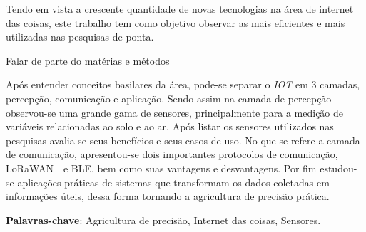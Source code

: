 \documentclass[
article,			%
12pt,				%
oneside,			%
a4paper,			%
english,			%
brazil,				%
sumario=tradicional
]{abntex2}
\begin{document}

\frenchspacing 


%
%

\maketitle



\begin{resumoumacoluna}
    Tendo em vista a crescente quantidade de novas tecnologias na área de internet das coisas, este trabalho tem como objetivo observar as mais eficientes e mais utilizadas nas pesquisas de ponta.

    Falar de parte do matérias e métodos

    Após entender conceitos basilares da área, pode-se separar o \textit{IOT} em 3 camadas, percepção, comunicação e aplicação. Sendo assim na camada de percepção observou-se uma grande gama de sensores, principalmente para a medição de variáveis relacionadas ao solo e ao ar. Após listar os sensores utilizados nas pesquisas avalia-se seus benefícios e seus casos de uso. No que se refere a camada de comunicação, apresentou-se dois importantes protocolos de comunicação, LoRaWAN~\texttrademark~e BLE, bem como suas vantagens e desvantagens. Por fim estudou-se aplicações práticas de sistemas que transformam os dados coletadas em informações úteis, dessa forma tornando a agricultura de precisão prática.

  \textbf{Palavras-chave}: Agricultura de precisão, Internet das coisas, Sensores.

  \vspace{\onelineskip}

  \noindent
\end{resumoumacoluna}
\end{document}
